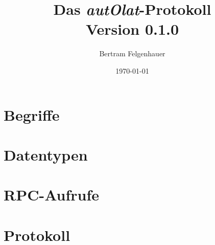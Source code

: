 \documentclass{article}
\begin{document}
\titlepage
\title{Das \emph{autOlat}-Protokoll\\
  Version 0.1.0}
\author{Bertram Felgenhauer}
\date{\today}
\maketitle
\newpage
\tableofcontents
\newpage
\section{Begriffe}


\section{Datentypen}


\section{RPC-Aufrufe}


\section{Protokoll}

\end{document}
